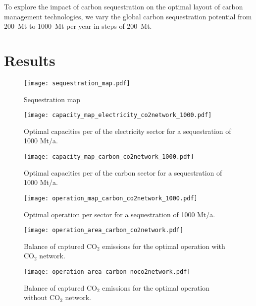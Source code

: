 \documentclass[conference]{IEEEtran}
\begin{document}
To explore the impact of carbon sequestration on the optimal layout of carbon management technologies, we vary the global carbon sequestration potential from 200~Mt to 1000~Mt per year in steps of 200~Mt.


\section{Results}
\label{sec:results}

\begin{figure}
    \centering
    \texttt{[image: sequestration\_map.pdf]}
    \caption{Sequestration map}
    \label{fig:sequestration_map}
\end{figure}


\begin{figure}[h]
    \centering
    \texttt{[image: capacity\_map\_electricity\_co2network\_1000.pdf]}
    \caption{Optimal capacities per of the electricity sector for a sequestration of 1000 Mt/a.}
    \label{fig:capacity_map_noco2network_1000}
\end{figure}


\begin{figure}[h]
    \centering
    \texttt{[image: capacity\_map\_carbon\_co2network\_1000.pdf]}
    \caption{Optimal capacities per of the carbon sector for a sequestration of 1000 Mt/a.}
    \label{fig:capacity_map_noco2network_1000}
\end{figure}



\begin{figure*}
    \centering
    \texttt{[image: operation\_map\_carbon\_co2network\_1000.pdf]}
    \caption{Optimal operation per sector for a sequestration of 1000 Mt/a.}
    \label{fig:operation_map_noco2network_1000}
\end{figure*}


\begin{figure}
    \centering
    \texttt{[image: operation\_area\_carbon\_co2network.pdf]}
    \caption{Balance of captured CO$_2$ emissions for the optimal operation with CO$_2$ network.}
    \label{fig:operation_area_carbon_co2network}
\end{figure}

\begin{figure}
    \centering
    \texttt{[image: operation\_area\_carbon\_noco2network.pdf]}
    \caption{Balance of captured CO$_2$ emissions for the optimal operation without CO$_2$ network.}
    \label{fig:operation_area_carbon_noco2network}
\end{figure}
\end{document}

